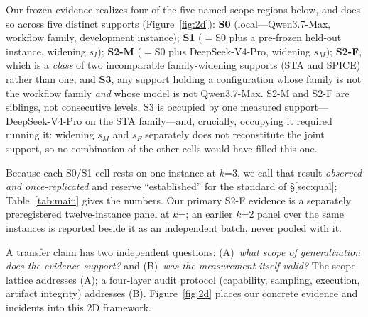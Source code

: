 \documentclass{article}
\begin{document}
Our frozen evidence realizes four of the five named scope regions below, and does so across five distinct supports (Figure~\ref{fig:2d}): \textbf{S0} (local---Qwen3.7-Max, workflow family, development instance); \textbf{S1} ($=$S0 plus a pre-frozen held-out instance, widening $s_I$); \textbf{S2-M} ($=$S0 plus DeepSeek-V4-Pro, widening $s_M$); \textbf{S2-F}, which is a \emph{class} of two incomparable family-widening supports (STA and SPICE) rather than one; and \textbf{S3}, any support holding a configuration whose family is not the workflow family \emph{and} whose model is not Qwen3.7-Max. S2-M and S2-F are siblings, not consecutive levels. S3 is occupied by one measured support---DeepSeek-V4-Pro on the STA family---and, crucially, occupying it required running it: widening $s_M$ and $s_F$ separately does not reconstitute the joint support, so no combination of the other cells would have filled this one.

Because each S0/S1 cell rests on one instance at $k$=3, we call that result \emph{observed and once-replicated} and reserve ``established'' for the standard of \S\ref{sec:qual}; Table~\ref{tab:main} gives the numbers. Our primary S2-F evidence is a separately preregistered twelve-instance panel at $k$=\StatEightAK{}; an earlier $k$=2 panel over the same instances is reported beside it as an independent batch, never pooled with it.

A transfer claim has two independent questions: (A)~\emph{what scope of generalization does the evidence support?} and (B)~\emph{was the measurement itself valid?} The scope lattice addresses (A); a four-layer audit protocol (capability, sampling, execution, artifact integrity) addresses (B). Figure~\ref{fig:2d} places our concrete evidence and incidents into this 2D framework.
\end{document}
